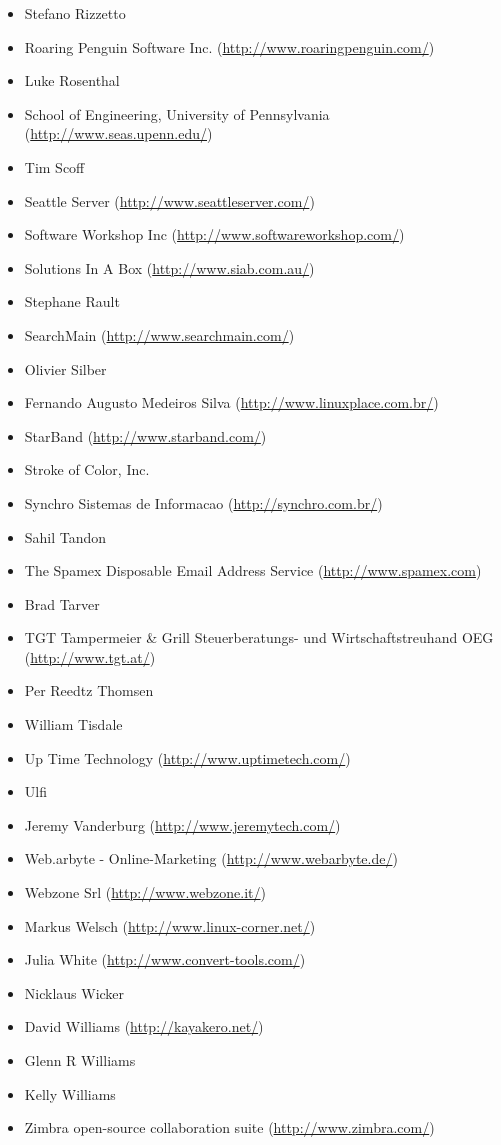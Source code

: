 \documentclass[a4paper,titlepage,12pt]{article}
\begin{document}
\begin{itemize}
	\item Stefano Rizzetto
	\item Roaring Penguin Software Inc. (\url{http://www.roaringpenguin.com/})
	\item Luke Rosenthal
	\item School of Engineering, University of Pennsylvania (\url{http://www.seas.upenn.edu/})
	\item Tim Scoff
	\item Seattle Server (\url{http://www.seattleserver.com/})
	\item Software Workshop Inc (\url{http://www.softwareworkshop.com/})
	\item Solutions In A Box (\url{http://www.siab.com.au/})
	\item Stephane Rault
	\item SearchMain (\url{http://www.searchmain.com/})
	\item Olivier Silber
	\item Fernando Augusto Medeiros Silva (\url{http://www.linuxplace.com.br/})
	\item StarBand (\url{http://www.starband.com/})
	\item Stroke of Color, Inc.
	\item Synchro Sistemas de Informacao (\url{http://synchro.com.br/})
	\item Sahil Tandon
	\item The Spamex Disposable Email Address Service (\url{http://www.spamex.com})
	\item Brad Tarver
	\item TGT Tampermeier \& Grill Steuerberatungs- und Wirtschaftstreuhand OEG (\url{http://www.tgt.at/})
	\item Per Reedtz Thomsen
	\item William Tisdale
	\item Up Time Technology (\url{http://www.uptimetech.com/})
	\item Ulfi
	\item Jeremy Vanderburg (\url{http://www.jeremytech.com/})
	\item Web.arbyte - Online-Marketing (\url{http://www.webarbyte.de/})
	\item Webzone Srl (\url{http://www.webzone.it/})
	\item Markus Welsch (\url{http://www.linux-corner.net/})
	\item Julia White (\url{http://www.convert-tools.com/})
	\item Nicklaus Wicker
	\item David Williams (\url{http://kayakero.net/})
	\item Glenn R Williams
	\item Kelly Williams
	\item Zimbra open-source collaboration suite (\url{http://www.zimbra.com/})
    \end{itemize}
\end{document}
